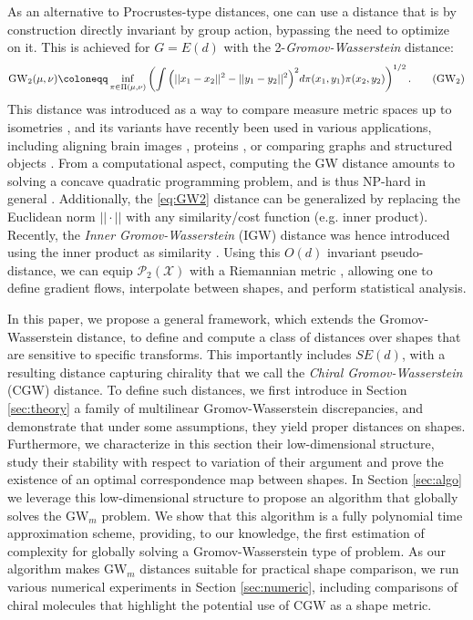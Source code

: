\documentclass{article}
\newcommand{\X}{\mathcal{X}}
\newcommand{\1}{\mathbf{1}}
\newcommand{\CGW}{\mathrm{CGW}}
\newcommand{\GW}{\mathrm{GW}}
\renewcommand{\P}{\mathcal{P}}
\theoremstyle{definition}
\theoremstyle{remark}
\begin{document}
As an alternative to Procrustes-type distances, one can use a distance that is by construction directly invariant by group action, bypassing the need to optimize on it. This is achieved for $G=E(d)$ with the 2-\emph{Gromov-Wasserstein} distance:
\begin{equation}\label{eq:GW2}
    \GW_2 (\mu,\nu) \coloneqq  \inf_{\pi\in\Pi(\mu,\nu)}\left(\int\Big(||x_1-x_2||^2-||y_1-y_2||^2\Big)^2d\pi(x_1,y_1)\pi(x_2,y_2)\right)^{1/2}. \tag{$\GW_2$}
\end{equation}
This distance was introduced as a way to compare measure metric spaces up to isometries \cite{memoli2011gromov,sturm2006geometry}, and its variants have recently been used in various applications, including aligning brain images \cite{thual2022aligning}, proteins \cite{tajmir2025alignment}, or comparing graphs \cite{alvarez2018gromov,chowdhury2019gromov} and structured objects \cite{vayer2020fused}. From a computational aspect, computing the GW distance amounts to solving a concave quadratic programming problem, and is thus NP-hard in general \cite{rioux2024entropic}. 
Additionally, the \ref{eq:GW2} distance can be generalized by replacing the Euclidean norm $||\cdot|| $ with any similarity/cost function (e.g. inner product).  Recently, the \emph{Inner Gromov-Wasserstein} (IGW) distance was hence introduced using the inner product as similarity \cite{alvarez2018gromov,vayer2020contribution}. Using this $O(d)$ invariant pseudo-distance, we can  equip $\P_2(\X)$ with a Riemannian metric \cite{zhang2025gradient}, allowing one to define gradient flows, interpolate between shapes, and perform statistical analysis. 

In this paper, we propose a general framework, which extends the Gromov-Wasserstein distance, to define and compute a class of distances over shapes that are sensitive to specific   transforms. This importantly includes $SE(d)$, with a resulting distance capturing chirality that we call the \emph{Chiral Gromov-Wasserstein} (CGW) distance. To define such distances, we first  introduce in Section \ref{sec:theory} a family of multilinear Gromov-Wasserstein discrepancies, and demonstrate that under some assumptions, they yield proper distances on shapes. Furthermore, we characterize in this section their low-dimensional structure, study their stability with respect to variation of their argument and 
prove the existence of an optimal correspondence map between shapes. 
In Section \ref{sec:algo} we leverage this low-dimensional structure to propose an algorithm that globally solves the $\GW_m$ problem. We show that this algorithm is a fully polynomial time approximation scheme, providing, to our knowledge, the first estimation of complexity for globally solving a Gromov-Wasserstein type of problem. As our algorithm makes $\GW_m$ distances suitable for practical shape comparison, we run various numerical experiments in Section \ref{sec:numeric}, including comparisons of chiral molecules that highlight the potential use of $\CGW$ as a shape metric.
\end{document}
